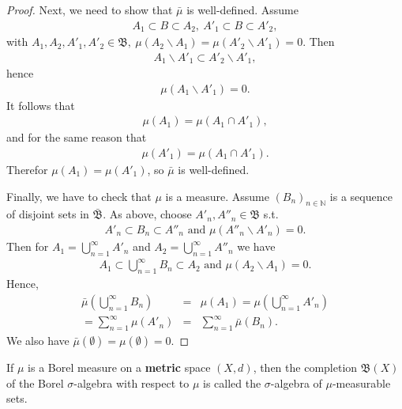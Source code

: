 \begin{proof}
    Next, we need to show that \(\bar{\mu}\) is well-defined. Assume
    \begin{align*}
        A_1\subset B\subset A_2, \ A'_1\subset B \subset A'_2,
    \end{align*}
    with \(A_1, A_2, A'_1, A'_2\in\mathfrak{B}, \ \mu(A_2\backslash A_1) = \mu(A'_2\backslash A'_1) = 0\). Then
    \begin{align*}
        A_1\backslash A'_1\subset A'_2\backslash A'_1,
    \end{align*}
    hence
    \begin{align*}
        \mu(A_1\backslash A'_1) = 0.
    \end{align*}
    It follows that
    \begin{align*}
        \mu(A_1) = \mu(A_1\cap A'_1),
    \end{align*}
    and for the same reason that
    \begin{align*}
        \mu(A'_1) = \mu(A_1\cap A'_1).
    \end{align*}
    Therefor \(\mu(A_1) = \mu(A'_1)\), so \(\bar{\mu}\) is well-defined.

    Finally, we have to check that \(\mu\) is a measure. Assume \(\left( B_n \right)_{n\in\mathbb{N}}\) is a sequence of disjoint sets in 
    \(\bar{\mathfrak{B}}\). As above, choose \(A'_n, A''_n\in \mathfrak{B}\) s.t.
    \begin{align*}
        A'_n \subset B_n \subset A''_n \text{ and } \mu(A''_n\backslash A'_n) = 0.
    \end{align*}
    Then for \(A_1 = \bigcup\limits_{n=1}^{\infty} A'_n\) and \(A_2 = \bigcup\limits_{n=1}^{\infty} A''_n\) we have
    \begin{align*}
        A_1 \subset \bigcup\limits_{n=1}^{\infty} B_n\subset A_2 \text{ and } \mu(A_2\backslash A_1) = 0.
    \end{align*}
    Hence,
    \begin{eqnarray*}
        \bar{\mu} \left( \bigcup\limits_{n=1}^{\infty}B_n \right) &=& \mu(A_1) = \mu\left( \bigcup\limits_{n=1}^{\infty} A'_n \right) \\
        = \sum\limits_{n=1}^{\infty} \mu(A'_n) &=& \sum\limits_{n=1}^{\infty}\bar{\mu}(B_n).
    \end{eqnarray*}
    We also have \(\bar{\mu}(\emptyset) = \mu(\emptyset) = 0\).
\end{proof}
\begin{definition}
    If \(\mu\) is a Borel measure on a \textbf{metric} space \((X,d)\), then the completion \(\mathfrak{B}(X)\) of the Borel \(\sigma\)-algebra
    with respect to \(\mu\) is called the \(\sigma\)-algebra of \(\mu\)-measurable sets.
\end{definition}

